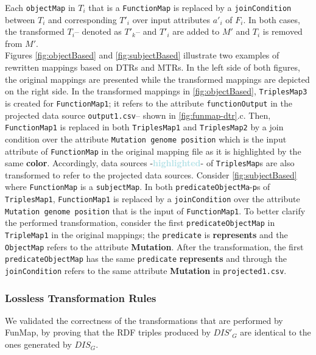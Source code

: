 Each \verb|objectMap| in $T_i$ that is a \verb|FunctionMap| is replaced by a \verb|joinCondition| between $T_i$ and corresponding $T'_i$ over input attributes $a'_i$ of $F_i$. 
In both cases, the transformed $T_i$-- denoted as $T'_k$-- and $T'_i$ are added to $M'$ and $T_i$ is removed from $M'$. \\     
Figures \ref{fig:objectBased} and \ref{fig:subjectBased} illustrate two examples of rewritten mappings based on DTRs and MTRs. In the left side of both figures, the original mappings are presented while the transformed mappings are depicted on the right side. In the transformed mappings in \autoref{fig:objectBased}, \verb|TriplesMap3| is created for \verb|FunctionMap1|; it refers to the attribute \verb|functionOutput| in the projected data source \verb|output1.csv|-- shown in \autoref{fig:funmap-dtr}.c. Then, \verb|FunctionMap1| is replaced in both \verb|TriplesMap1| and \verb|TriplesMap2| by a join condition over the attribute \verb|Mutation genome position| which is the input attribute of \verb|FunctionMap| in the original mapping file as it is highlighted by the same \textcolor{metallicSeaweed}{\textbf{color}}. Accordingly, data sources -\textcolor{powderBlue}{\textbf{highlighted}}- of \verb|TriplesMap|s are also transformed to refer to the projected data sources. 
Consider \autoref{fig:subjectBased} where \verb|FunctionMap| is a \verb|subjectMap|. In both \verb|predicateObjectMa|-\verb|p|s of \verb|TriplesMap1|, \verb|FunctionMap1| is replaced by a \verb|joinCondition| over the attribute \verb|Mutation genome position| that is the input of \verb|FunctionMap1|. To better clarify the performed transformation, consider the first \verb|predicateObjectMap| in \verb|TripleMap1| in the original mappings; the \verb|predicate| is \textcolor{burntSienna}{\textbf{represents}} and the \verb|ObjectMap| refers to the attribute \textcolor{metallicSeaweed}{\textbf{Mutation}}. After the transformation, the first \verb|predicateObjectMap| has the same \verb|predicate| \textcolor{burntSienna}{\textbf{represents}} and through the \verb|joinCondition| refers to the same attribute \textcolor{metallicSeaweed}{\textbf{Mutation}} in \verb|projected1.csv|. 

\subsubsection{Lossless Transformation Rules}
\label{subsec:formalEval}
We validated the correctness of the transformations that are performed by FunMap, by proving that the RDF triples produced by $DIS'_G$ are identical to the ones generated by $DIS_G$.


